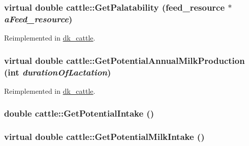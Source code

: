 \label{classcattle_acc71b376de54129fb52a75aa17476cb0}
\hypertarget{classcattle_aeac6984f3aed6a1b0c37b609ffdbc02a}{
\subsubsection[{GetPalatability}]{\setlength{\rightskip}{0pt plus 5cm}virtual double cattle::GetPalatability ({\bf feed\_\-resource} $\ast$ {\em aFeed\_\-resource})}}
\label{classcattle_aeac6984f3aed6a1b0c37b609ffdbc02a}


Reimplemented in \hyperlink{classdk__cattle_a7ab0e6b1bce961a575452a47d6ac5650}{dk\_\-cattle}.\hypertarget{classcattle_a4de5ef9578b7f00f7fd0135001d2bf0f}{
\subsubsection[{GetPotentialAnnualMilkProduction}]{\setlength{\rightskip}{0pt plus 5cm}virtual double cattle::GetPotentialAnnualMilkProduction (int {\em durationOfLactation})}}
\label{classcattle_a4de5ef9578b7f00f7fd0135001d2bf0f}


Reimplemented in \hyperlink{classdk__cattle_a21fa59d45d64b1aa106d3e4e2912550a}{dk\_\-cattle}.\hypertarget{classcattle_a2aefe7556df04aa4cff0e773d6c50db4}{
\subsubsection[{GetPotentialIntake}]{\setlength{\rightskip}{0pt plus 5cm}double cattle::GetPotentialIntake ()}}
\label{classcattle_a2aefe7556df04aa4cff0e773d6c50db4}
\hypertarget{classcattle_aee7aea077f7f8fd48035eae6308bdabc}{
\subsubsection[{GetPotentialMilkIntake}]{\setlength{\rightskip}{0pt plus 5cm}virtual double cattle::GetPotentialMilkIntake ()}}
\label{classcattle_aee7aea077f7f8fd48035eae6308bdabc}


